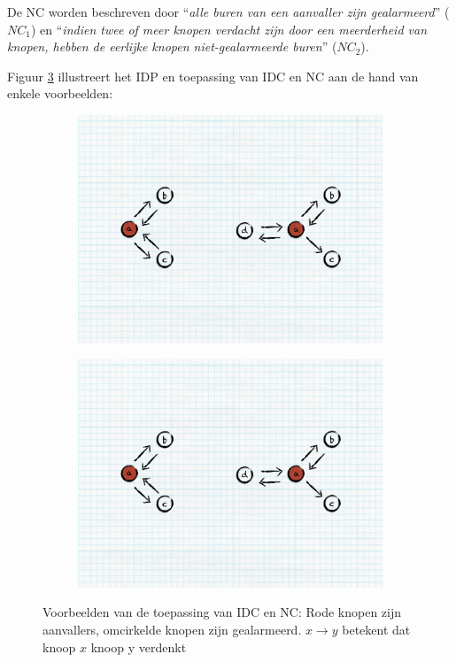 De NC worden beschreven door ``\emph{alle buren van een aanvaller zijn
gealarmeerd}'' ($NC_1$) en ``\emph{indien twee of meer knopen verdacht zijn door
een meerderheid van knopen, hebben de eerlijke knopen niet-gealarmeerde buren}''
($NC_2$).

Figuur \ref{fig:idp-examples} illustreert het IDP en toepassing van IDC en NC
aan de hand van enkele voorbeelden:

\begin{figure}[ht]
\centering
\begin{subfigure}{.49\textwidth}
  \centering
  \includegraphics[width=.8\linewidth]{./resources/idp-nc-s1.pdf}
  \caption{}
  \label{fig:idp-examples-1}
\end{subfigure}
\begin{subfigure}{.49\textwidth}
  \centering
  \includegraphics[width=.8\linewidth]{./resources/idp-nc-s2.pdf}
  \caption{}
  \label{fig:idp-examples-2}
\end{subfigure}
\caption[Voorbeelden van de toepassing van IDC en NC]{Voorbeelden van de
toepassing van IDC en NC: Rode knopen zijn aanvallers, omcirkelde knopen zijn
gealarmeerd. $x \rightarrow y$ betekent dat knoop $x$ knoop y verdenkt}
\label{fig:idp-examples}
\end{figure}

